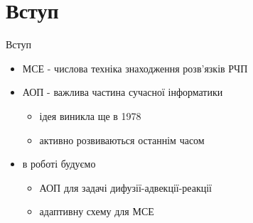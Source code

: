 
\section{Вступ}
\begin{frame}{Вступ}
	\begin{itemize}
		\item МСЕ - числова техніка знаходження розв'язків РЧП
		\item АОП - важлива частина сучасної інформатики
			\begin{itemize}
				\item{ідея виникла ще в 1978 }
				\item активно розвиваються останнім часом \cite{ainsworth2011posteriori, eriksson1995introduction,verfurth1994posteriori,verfurth1996review}
			\end{itemize}
		\item в роботі будуємо
			\begin{itemize}
				\item АОП для задачі дифузії-адвекції-реакції
				\item адаптивну схему для МСЕ
			\end{itemize}
	\end{itemize}
\end{frame}
